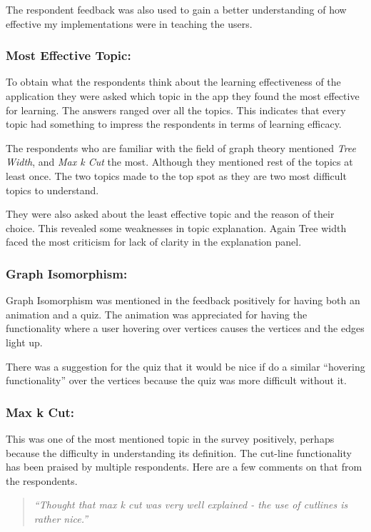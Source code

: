 The respondent feedback was also used to gain a better understanding of how effective my implementations were in teaching the users.

\subsubsection{Most Effective Topic:}
To obtain what the respondents think about the learning effectiveness of the
application they were asked which topic in the app they found the most effective
for learning. The answers ranged over all the topics. This indicates that every
topic had something to impress the respondents in terms of learning efficacy.


The respondents who are familiar with the field of graph theory mentioned
\emph{Tree Width}, and \emph{Max k Cut} the most. Although they mentioned rest
of the topics at least once. The two topics made to the top spot as they are
two most difficult topics to understand.

They were also asked about the least effective topic and the reason of their choice. 
This revealed some weaknesses in topic explanation. Again Tree width
faced the most criticism for lack of clarity in the explanation panel. 

\subsubsection{Graph Isomorphism:}
Graph Isomorphism was mentioned in the feedback positively for having both an
animation and a quiz. The animation was appreciated for having the
functionality where a user hovering over vertices causes the vertices and
the edges light up. 

There was a suggestion for the quiz 
that it would be nice if do a similar ``hovering functionality'' over the
vertices because the quiz was more difficult without it.

\subsubsection{Max k Cut:}
This was one of the most mentioned topic in the survey positively,
perhaps because the difficulty in understanding its definition. The cut-line
functionality has been praised by multiple respondents. Here are a few
comments on that from the respondents.

\begin{quote}
\emph{``Thought that max k cut was very well explained - the use of cutlines is
rather nice.''}
\end{quote}

